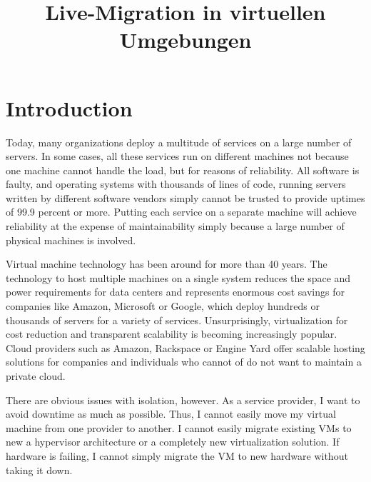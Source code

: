 \documentclass[a4paper]{IEEEtran}
\title{Live-Migration in virtuellen Umgebungen}
\author{\IEEEauthorblockN{Tim Felgentreff}
\IEEEauthorblockA{Hasso-Plattner-Institut\\
Potsdam, Germany\\
Email: \url{tim.felgentreff@student.hpi.uni-potsdam.de}}%
\and
\IEEEauthorblockN{Tobias.Pape}
\IEEEauthorblockA{Hasso-Plattner-Institut\\
Potsdam, Germany\\
Email: \url{tobias.pape@student.hpi.uni-potsdam.de}}
}
\begin{document}
\maketitle

\begin{abstract}
  
\end{abstract}

\IEEEpeerreviewmaketitle


\section{Introduction}
\label{sec:introduction}
Today, many organizations deploy a multitude of services on a large
number of servers. In some cases, all these services run on different
machines not because one machine cannot handle the load, but for
reasons of reliability.  All software is faulty\cite{zellerprograms},
and operating systems with thousands of lines of code, running servers
written by different software vendors simply cannot be trusted to
provide uptimes of 99.9 percent or more. Putting each service on a
separate machine will achieve reliability at the expense of
maintainability simply because a large number of physical machines is
involved.

Virtual machine technology has been around for more than 40
years\cite{tanenbaum1992modern}. The technology to host multiple
machines on a single system reduces the space and power requirements
for data centers and represents enormous cost savings for companies
like Amazon, Microsoft or Google, which deploy hundreds or thousands
of servers for a variety of services. Unsurprisingly, virtualization
for cost reduction and transparent scalability is becoming
increasingly popular. Cloud providers such as Amazon, Rackspace or
Engine Yard offer scalable hosting solutions for companies and
individuals who cannot of do not want to maintain a private cloud.

There are obvious issues with isolation, however. As a service
provider, I want to avoid downtime as much as possible. Thus, I cannot
easily move my virtual machine from one provider to another. I cannot
easily migrate existing VMs to new a hypervisor architecture or a
completely new virtualization solution. If hardware is failing, I
cannot simply migrate the VM to new hardware without taking it down.
\end{document}
